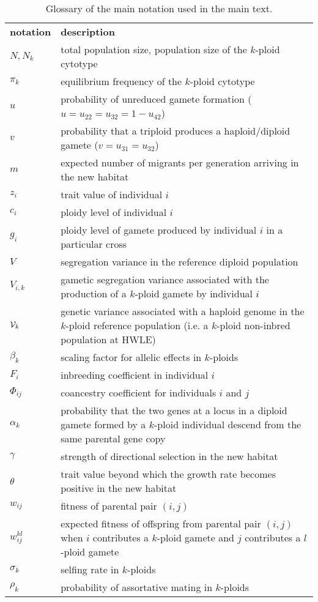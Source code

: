 \documentclass[11pt,a4paper]{article}
\begin{document}
\begin{table}[t]
\caption{Glossary of the main notation used in the main text.
} \label{tbl:glossary}
\centering
\small
\begin{tabularx}{\linewidth}{lX}
\cline{1-2}
\textbf{notation}   & \textbf{description}   \\ \cline{1-2}
$N, N_k$ & total population size, population size of the $k$-ploid cytotype \\
$\pi_k$ & equilibrium frequency of the $k$-ploid cytotype \\
$u$ & probability of unreduced gamete formation ($u=u_{22}=u_{32}=1-u_{42}$)\\
$v$ & probability that a triploid produces a haploid/diploid gamete
  ($v=u_{31}=u_{32}$)\\
$m$ & expected number of migrants per generation arriving in the new habitat \\
$z_i$ & trait value of individual $i$ \\
$c_i$ & ploidy level of individual $i$ \\
$g_i$ & ploidy level of gamete produced by individual $i$ in a particular cross\\
$V$ & segregation variance in the reference diploid population \\
$V_{i,k}$ & gametic segregation variance associated with the production of a
  $k$-ploid gamete by individual $i$ \\
$\mathcal{V}_k$ & genetic variance associated with a haploid genome in the $k$-ploid
  reference population (i.e. a $k$-ploid non-inbred population at HWLE) \\
$\beta_{k}$ & scaling factor for allelic effects in $k$-ploids \\
$F_i$ & inbreeding coefficient in individual $i$ \\
$\Phi_{ij}$ & coancestry coefficient for individuals $i$ and $j$ \\
$\alpha_k$ & probability that the two genes at a locus in a diploid gamete
  formed by a $k$-ploid individual descend from the same parental gene copy\\
$\gamma$ & strength of directional selection in the new habitat\\
$\theta$ & trait value beyond which the growth rate becomes positive in the new
habitat \\ $w_{ij}$ & fitness of parental pair $(i,j)$ \\
$w_{ij}^{kl}$ & expected fitness of offspring from parental pair $(i,j)$ when
$i$ contributes a $k$-ploid gamete and $j$ contributes a $l$-ploid gamete \\
$\sigma_k$ & selfing rate in $k$-ploids \\
$\rho_k$ & probability of assortative mating in $k$-ploids \\
\cline{1-2}
\end{tabularx}%
\end{table}
\end{document}
